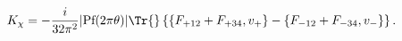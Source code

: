 \begin{equation}\label{eq:kchi-1}
 K_\chi=-\frac{i}{32\pi^2}|\text{Pf}(2\pi\theta)|
 \Tr{}\left\{\{F_{+12}+F_{+34},v_+\}-\{F_{-12}+F_{-34},v_-\}\right\}.
\end{equation}

